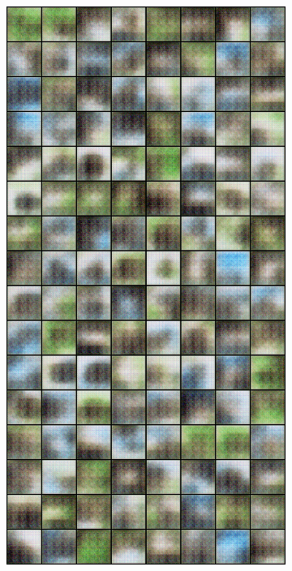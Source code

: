 \begin{figure}[H]
    \centering

    \begin{subfigure}{0.2\textwidth}
        \centering
        \includegraphics[width=0.95\linewidth]{cifar10/64/fake_sample_epoch_0005.png}
        \caption{}
        \label{subfig:cifar10/64/fake_sample_epoch_0005}

\end{subfigure}
\end{figure}
